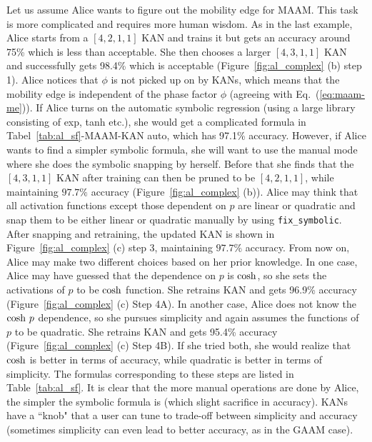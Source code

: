 \documentclass{article}
\numberwithin{equation}{section}
\numberwithin{figure}{section}
\begin{document}
Let us assume Alice wants to figure out the mobility edge for MAAM. This task is more complicated and requires more human wisdom. As in the last example, Alice starts from a $[4,2,1,1]$ KAN and trains it but gets an accuracy around 75\% which is less than acceptable. She then chooses a larger $[4,3,1,1]$ KAN and successfully gets 98.4\% which is acceptable (Figure~\ref{fig:al_complex} (b) step 1). Alice notices that $\phi$ is not picked up on by KANs, which means that the mobility edge is independent of the phase factor $\phi$ (agreeing with Eq.~(\ref{eq:maam-me})). If Alice turns on the automatic symbolic regression (using a large library consisting of exp, tanh etc.), she would get a complicated formula in Tabel~\ref{tab:al_sf}-MAAM-KAN auto, which has 97.1\% accuracy. However, if Alice wants to find a simpler symbolic formula, she will want to use the manual mode where she does the symbolic snapping by herself. Before that she finds that the $[4,3,1,1]$ KAN after training can then be pruned to be $[4,2,1,1]$, while maintaining $97.7\%$ accuracy (Figure~\ref{fig:al_complex} (b)). Alice may think that all activation functions except those dependent on $p$ are linear or quadratic and snap them to be either linear or quadratic manually by using \texttt{fix\_symbolic}. After snapping and retraining, the updated KAN is shown in Figure~\ref{fig:al_complex} (c) step 3, maintaining $97.7\%$ accuracy. From now on, Alice may make two different choices based on her prior knowledge. In one case, Alice may have guessed that the dependence on $p$ is ${\rm cosh}$, so she sets the activations of $p$ to be ${\rm cosh}$ function. She retrains KAN and gets 96.9\% accuracy (Figure~\ref{fig:al_complex} (c) Step 4A). In another case, Alice does not know the ${\rm cosh}\ p$ dependence, so she pursues simplicity and again assumes the functions of $p$ to be quadratic. She retrains KAN and gets 95.4\% accuracy (Figure~\ref{fig:al_complex} (c) Step 4B). If she tried both, she would realize that ${\rm cosh}$ is better in terms of accuracy, while quadratic is better in terms of simplicity. The formulas corresponding to these steps are listed in Table~\ref{tab:al_sf}. It is clear that the more manual operations are done by Alice, the simpler the symbolic formula is (which slight sacrifice in accuracy). KANs have a ``knob" that a user can tune to trade-off between simplicity and accuracy (sometimes simplicity can even lead to better accuracy, as in the GAAM case).
\end{document}
